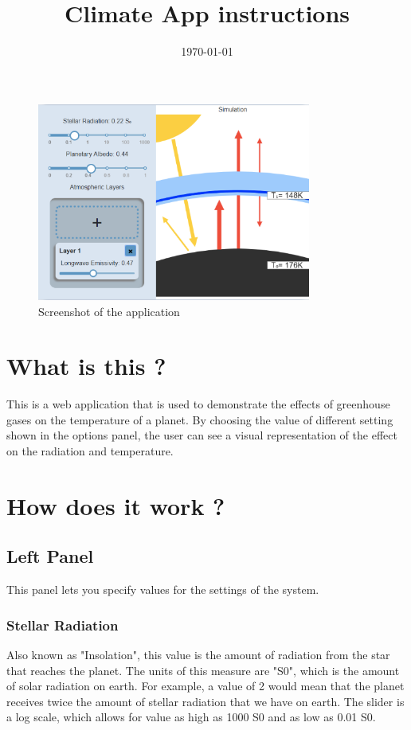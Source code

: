 \documentclass[a4paper,12pt]{article}
\title{\vspace{-2.0cm}Climate App instructions\vspace{-2.0cm}}
\date{\today}
\begin{document}
\maketitle
\thispagestyle{fancy}

\begin{figure}[h]
  \centering
  \includegraphics[width=90mm]{demo}
  \caption{Screenshot of the application}
  \label{fig:demo}
\end{figure}

\section*{What is this ?}

This is a web application that is used to demonstrate the effects of greenhouse gases on the temperature of a planet. By choosing the value of different setting shown in the options panel, the user can see a visual representation of the effect on the radiation and temperature. 

\section*{How does it work ?}

\subsection*{Left Panel}

This panel lets you specify values for the settings of the system.

\subsubsection*{Stellar Radiation}

Also known as "Insolation", this value is the amount of radiation from the star that reaches the planet. The units of this measure are "S0", which is the amount of solar radiation on earth. For example, a value of 2 would mean that the planet receives twice the amount of stellar radiation that we have on earth. The slider is a log scale, which allows for value as high as 1000 S0 and as low as 0.01 S0.
\end{document}
